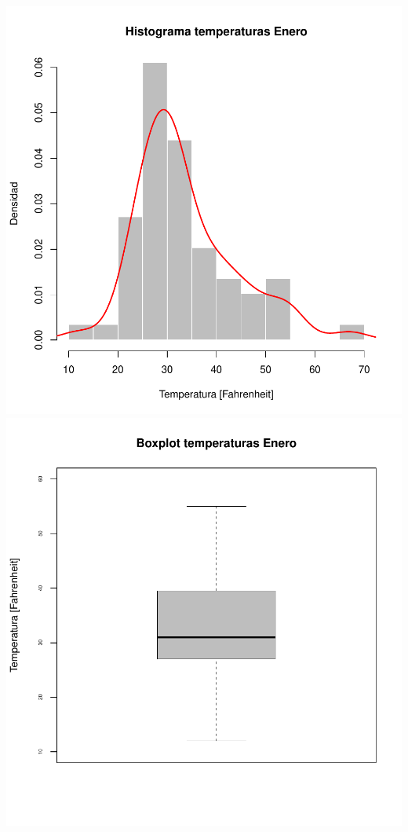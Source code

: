 \documentclass[11pt]{article}
\begin{document}
\begin{center}
    \includegraphics[scale = 0.3]{histte}
    \includegraphics[scale = 0.3]{boxte}
\end{center}
\end{document}
